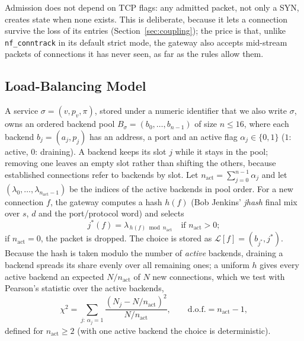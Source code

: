 \documentclass[conference]{IEEEtran}
\begin{document}
Admission does not depend on TCP flags: any admitted packet, not only a SYN,
creates state when none exists. This is deliberate, because it lets a
connection survive the loss of its entries (Section~\ref{sec:coupling}); the
price is that, unlike \texttt{nf\_conntrack} in its default strict mode, the
gateway also accepts mid-stream packets of connections it has never seen, as
far as the rules allow them.

\subsection{Load-Balancing Model}
A service $\sigma=(v,p_v,\pi)$, stored under a numeric identifier that we
also write $\sigma$, owns an ordered backend pool
$B_\sigma=(b_0,\dots,b_{n-1})$ of size $n \le 16$, where each backend
$b_j=(a_j, p_j)$ has an address, a port and an active flag $\alpha_j\in\{0,1\}$
($1$: active, $0$: draining). A backend keeps its slot $j$ while it stays in
the pool; removing one leaves an empty slot rather than shifting the others,
because established connections refer to backends by slot.
Let $n_{\mathrm{act}} = \sum_{j=0}^{n-1}\alpha_j$ and let
$(\lambda_0,\dots,\lambda_{n_{\mathrm{act}}-1})$ be the indices of the active
backends in pool order. For a new connection $f$, the gateway computes a hash
$h(f)$ (Bob Jenkins' \textit{jhash} final mix over $s$, $d$ and the
port/protocol word) and selects
\begin{equation}
j^*(f) = \lambda_{\,h(f) \bmod n_{\mathrm{act}}}
\quad \text{if } n_{\mathrm{act}} > 0;
\label{eq:select}
\end{equation}
if $n_{\mathrm{act}} = 0$, the packet is dropped. The choice is stored as
$\mathcal{L}[f]=(b_{j^*}, j^*)$. Because the hash is taken modulo the number
of \emph{active} backends, draining a backend spreads its share evenly over
all remaining ones; a uniform $h$ gives every active backend an expected
$N/n_{\mathrm{act}}$ of $N$ new connections, which we test with Pearson's
statistic over the active backends,
\begin{equation}
\chi^2 = \sum_{j:\,\alpha_j=1} \frac{(N_j - N/n_{\mathrm{act}})^2}{N/n_{\mathrm{act}}},
\qquad \text{d.o.f.} = n_{\mathrm{act}}-1,
\label{eq:chi2}
\end{equation}
defined for $n_{\mathrm{act}} \ge 2$ (with one active backend the choice is
deterministic).
\end{document}
